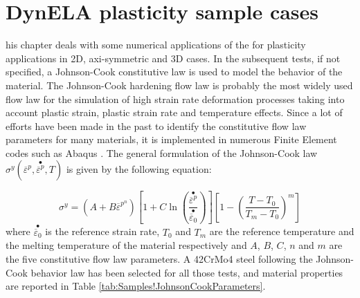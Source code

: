 %
%
%
\chapter{DynELA plasticity sample cases}

\startcontents[chapters]
\printmyminitoc[2]his chapter deals with some numerical applications of
the \DynELA for plasticity applications in 2D, axi-symmetric and
3D cases. In the subsequent tests, if not specified, a Johnson-Cook
constitutive law is used to model the behavior of the material. The
Johnson-Cook hardening flow law is probably the most widely used flow
law for the simulation of high strain rate deformation processes taking
into account plastic strain, plastic strain rate and temperature effects.
Since a lot of efforts have been made in the past to identify the
constitutive flow law parameters for many materials, it is implemented
in numerous Finite Element codes such as Abaqus \cite{abaqus20146}.
The general formulation of the Johnson-Cook law $\sigma^{y}(\overline{\varepsilon}^{p},\stackrel{\bullet}{\overline{\varepsilon}^{p}},T)$
is given by the following equation:

\begin{equation}
\sigma^{y}=\left(A+B\overline{\varepsilon}^{p^{n}}\right)\left[1+C\ln\left(\frac{\stackrel{\bullet}{\overline{\varepsilon}^{p}}}{\stackrel{\bullet}{\overline{\varepsilon}_{0}}}\right)\right]\left[1-\left(\frac{T-T_{0}}{T_{m}-T_{0}}\right)^{m}\right]\label{eq:Samples!Johnson-Cook}
\end{equation}
where $\stackrel{\bullet}{\overline{\varepsilon}_{0}}$ is the reference
strain rate, $T_{0}$ and $T_{m}$ are the reference temperature and
the melting temperature of the material respectively and $A$, $B$,
$C$, $n$ and $m$ are the five constitutive flow law parameters.
A 42CrMo4 steel following the Johnson-Cook behavior law has been selected
for all those tests, and material properties are reported in Table
\ref{tab:Samples!JohnsonCookParameters}.

